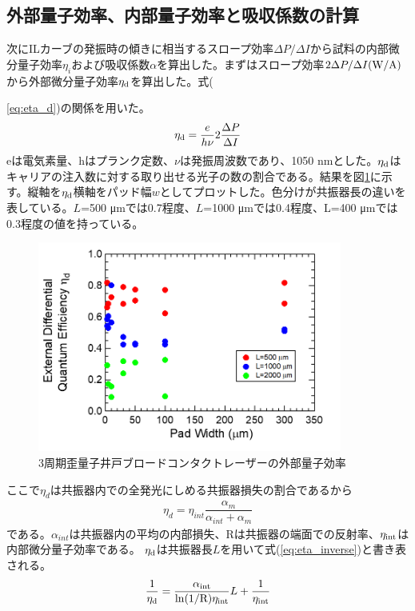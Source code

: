 \subsection{外部量子効率、内部量子効率と吸収係数の計算}%
次にILカーブの発振時の傾きに相当するスロープ効率$\Delta P/\Delta I$から試料の内部微分量子効率$\eta_{i}$および吸収係数$\alpha$を算出した。まずはスロープ効率$2 \Delta P/\Delta I \rm{ (W/A)}$から外部微分量子効率$\eta_{\rm{d}}$を算出した。式({\ref{eq:eta_d})の関係を用いた。
\begin{eqnarray}
\eta_{\rm{d}}=\dfrac{e}{h\nu}2\dfrac{\Delta P}{\Delta I} 
\label{eq:eta_d}
\end{eqnarray}
eは電気素量、hはプランク定数、$\nu$は発振周波数であり、1050 nmとした。$\eta_{\rm{d}}$はキャリアの注入数に対する取り出せる光子の数の割合である。結果を図\ref{fig:fig_3_1_3QW_broadcontact_id}に示す。縦軸を$\eta_{\rm{d}}$横軸をパッド幅$w$としてプロットした。色分けが共振器長の違いを表している。$L$=500 \si{\micro\metre}では0.7程度、$L$=1000         \si{\micro\metre}では0.4程度、L=400 \si{\micro\metre}では0.3程度の値を持っている。
\begin{figure}[h]
	\centering
	\includegraphics[width=10cm]{figure/fig_3_1_3QW_broadcontact_id.png}
	\caption{3周期歪量子井戸ブロードコンタクトレーザーの外部量子効率}
	\label{fig:fig_3_1_3QW_broadcontact_id}
\end{figure}

ここで$\eta_{d}$は共振器内での全発光にしめる共振器損失の割合であるから
\begin{eqnarray}
\eta_{d}=\eta_{int}\dfrac{\alpha_{m}}{\alpha_{int} +\alpha_{m}}
\end{eqnarray}
である。$\alpha_{int}$は共振器内の平均の内部損失、Rは共振器の端面での反射率、$\eta_{\rm{int}}$は内部微分量子効率である。
$\eta_{\rm{d}}$は共振器長$L$を用いて式(\ref{eq:eta_inverse})と書き表される。
\begin{eqnarray}
\dfrac{1}{\eta_{\rm{d}}}=\dfrac{\alpha_{\rm{int}}}{\rm{ln}(1/R)\eta_{int}}L+\dfrac{1}{\eta_{\rm{int}}}
\label{eq:eta_inverse}
\end{eqnarray}



}

